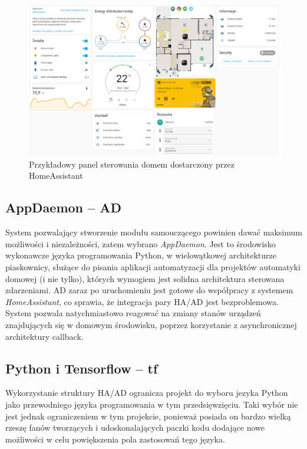 \begin{figure}
    \centering\includegraphics[width=1.00\textwidth]{img/ha_dashboard.png}
    \caption{Przykładowy panel sterowania domem dostarczony przez HomeAssistant} \label{fig:dashboard_example}
\end{figure}


\subsection{AppDaemon -- AD}
System pozwalający stworzenie modułu samouczącego powinien dawać maksimum możliwości i niezależności, zatem wybrano \textit{AppDaemon}. Jest to środowisko wykonawcze języka programowania Python, w wielowątkowej architekturze piaskownicy, służące do pisania aplikacji automatyzacji dla projektów automatyki domowej (i nie tylko), których wymogiem jest solidna architektura sterowana zdarzeniami. AD zaraz po uruchomieniu jest gotowe do współpracy z systemem \textit{HomeAssistant}, co sprawia, że integracja pary HA/AD jest bezproblemowa. System pozwala natychmiastowo reagować na zmiany stanów urządzeń znajdujących się w domowym środowisku, poprzez korzystanie z asynchronicznej architektury callback.

\subsection{Python i Tensorflow -- tf}
Wykorzystanie struktury HA/AD ogranicza projekt do wyboru jezyka Python jako przewodniego języka programowania w tym przedsięwzięciu. Taki wybór nie jest jednak ograniczeniem w tym projekcie, ponieważ posiada on bardzo wielką rzeszę fanów tworzących i udoskonalających paczki kodu dodające nowe możliwości w celu powiększenia pola zastosowań tego języka.

